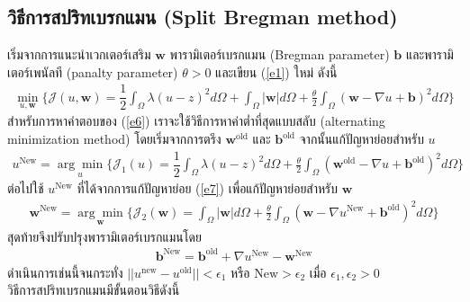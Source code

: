 \subsection{วิธีการสปริทเบรกแมน (Split Bregman method)}

\hspace{1cm} เริ่มจากการแนะนำเวกเตอร์เสริม $\boldsymbol{w}$ พารามิเตอร์เบรกแมน (Bregman parameter) $\boldsymbol{b}$ และพารามิเตอร์เพนัลที (panalty parameter) $\theta>0$ และเขียน (\ref{e1}) ใหม่ ดังนี้
\begin{align}
	\min_{u,\boldsymbol{w}} \{ \mathcal{J}(u,\boldsymbol{w}) = \dfrac{1}{2} \int_{\Omega} \lambda(u-z)^2 d\Omega +  \int_{\Omega}  | \boldsymbol{w}|  d\Omega + \frac{\theta}{2} \int_{\Omega} (\boldsymbol{w} - \nabla u + \boldsymbol{b})^{2} d\Omega \}
	\label{e6}
\end{align}
\hspace{1cm}สำหรับการหาคำตอบของ (\ref{e6}) เราจะใช้วิธีการหาค่าต่ำที่สุดแบบสลับ (alternating minimization method) โดยเริ่มจากการตรึง $\boldsymbol{w}^{\text{old}}$ และ $\boldsymbol{b}^{\text{old}}$ จากนั้นแก้ปัญหาย่อยสำหรับ $u$
\begin{align}
	u^{\text{New}}=\underset{u}{\arg\min} \{ \mathcal{J}_1(u) = \dfrac{1}{2} \int_{\Omega} \lambda(u-z)^2 d\Omega + \frac{\theta}{2} \int_{\Omega} (\boldsymbol{w}^{\text{old}} - \nabla u + \boldsymbol{b}^{\text{old}})^{2} d\Omega \}
	\label{e7}
\end{align}
ต่อไปใช้ $u^{\text{New}}$ ที่ได้จากการแก้ปัญหาย่อย (\ref{e7}) เพื่อแก้ปัญหาย่อยสำหรับ $\boldsymbol{w}$
\begin{align}
	\boldsymbol{w}^{\text{New}}=\underset{\boldsymbol{w}}{\arg\min} \{ \mathcal{J}_2(\boldsymbol{w}) = \int_{\Omega}  |\boldsymbol{w}|  d\Omega  + \frac{\theta}{2} \int_{\Omega} (\boldsymbol{w} - \nabla u^{\text{New}} + \boldsymbol{b}^{\text{old}})^{2} d\Omega \}
	\label{e8}
\end{align}
	สุดท้ายจึงปรับปรุงพารามิเตอร์เบรกแมนโดย 
\begin{align}
	\boldsymbol{b}^{\text{New}}=\boldsymbol{b}^{\text{old}}+\nabla u^{\text{New}}-\boldsymbol{w}^{\text{New}}
	\label{e9}
\end{align}
ดำเนินการเช่นนี้จนกระทั่ง $||u^{\text{new}}-u^{\text{old}}||< \epsilon_1$ หรือ $\text{New}>\epsilon_2$ เมื่อ $\epsilon_1,\epsilon_2>0$ \\ 
\vspace{0.5cm}
\hspace{1cm}วิธีการสปริทเบรกแมนมีขั้นตอนวิธีดังนี้ \\
\vspace{0.5cm}

\vspace{0.5cm}

